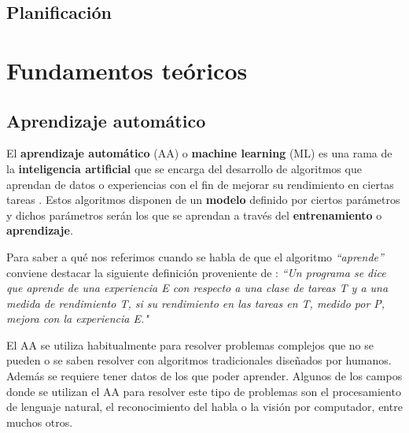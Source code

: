 \section{Planificación}



\clearpage
\chapter{Fundamentos teóricos} \label{cap:ft}


\section{Aprendizaje automático}

El \textbf{aprendizaje automático} (AA) o \textbf{machine learning} (ML) es una rama de la \textbf{inteligencia artificial} que se encarga del desarrollo de algoritmos que aprendan de datos o experiencias con el fin de mejorar su rendimiento en ciertas tareas \cite{alpaydin_introduction_2010-1, Mostafa2012, PatternRecogLibro, pml1Book}. Estos algoritmos disponen de un \textbf{modelo} definido por ciertos parámetros y dichos parámetros serán los que se aprendan a través del \textbf{entrenamiento} o \textbf{aprendizaje}.

Para saber a qué nos referimos cuando se habla de que el algoritmo \textit{``aprende''} conviene destacar la siguiente definición proveniente de \cite{mitchell_machine_1997}: \textit{``Un programa se dice que aprende de una experiencia E con respecto a una clase de tareas T y a una medida de rendimiento T, si su rendimiento en las tareas en T, medido por P, mejora con la experiencia E."}

El AA se utiliza habitualmente para resolver problemas complejos que no se pueden o se saben resolver con algoritmos tradicionales diseñados por humanos. Además se requiere tener datos de los que poder aprender. Algunos de los campos donde se utilizan el AA para resolver este tipo de problemas son el procesamiento de lenguaje natural, el reconocimiento del habla o la visión por computador, entre muchos otros.

